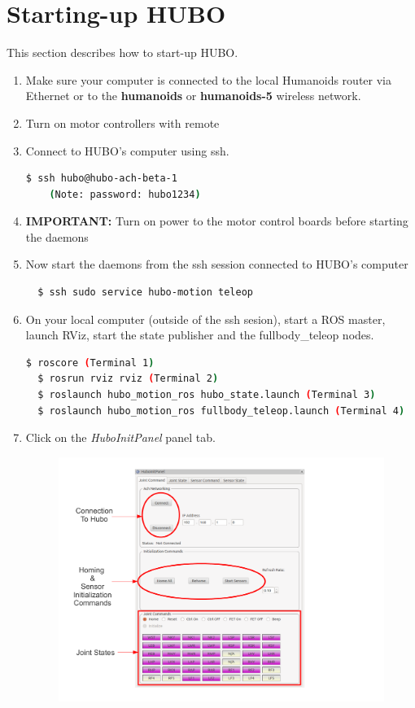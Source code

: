 \documentclass[letterpaper, 10 pt]{report}
\begin{document}
\section{Starting-up HUBO}
This section describes how to start-up HUBO.
\begin{enumerate}
  \item Make sure your computer is connected to the local Humanoids router via Ethernet or to the \textbf{humanoids} or \textbf{humanoids-5} wireless network.
  \item Turn on motor controllers with remote
  \item Connect to HUBO's computer using ssh.
  \begin{lstlisting}[language=bash]
  $ ssh hubo@hubo-ach-beta-1
  	(Note: password: hubo1234)
  \end{lstlisting}
  \item \textbf{IMPORTANT: }Turn on power to the motor control boards before starting the daemons
  \item Now start the daemons from the ssh session connected to HUBO's computer
  \begin{lstlisting}
  $ ssh sudo service hubo-motion teleop
  \end{lstlisting}
  \item On your local computer (outside of the ssh sesion), start a ROS master, launch RViz, start the state publisher and the fullbody\_teleop nodes.
  \begin{lstlisting}[language=bash]
  $ roscore (Terminal 1)
  $ rosrun rviz rviz (Terminal 2)
  $ roslaunch hubo_motion_ros hubo_state.launch (Terminal 3)
  $ roslaunch hubo_motion_ros fullbody_teleop.launch (Terminal 4)
  \end{lstlisting}
  \item Click on the \textit{HuboInitPanel} panel tab.
  \begin{figure}[ht]
    \centering
    \includegraphics[width=15.0cm]{figures/hubo-init.pdf}

\end{figure}
\end{enumerate}
\end{document}
